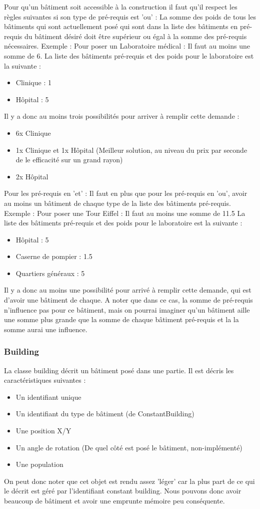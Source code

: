 \documentclass[a4paper,10pt,openany,oneside]{report}
\begin{document}
Pour qu'un bâtiment soit accessible à la construction il faut qu'il respect les règles suivantes si son type de pré-requis est 'ou' :
La somme des poids de tous les bâtiments qui sont actuellement posé qui sont dans la liste des bâtiments en pré-requis du bâtiment désiré doit être supérieur ou égal à la somme des pré-requis nécessaires.
Exemple :
Pour poser un Laboratoire médical : Il faut au moins une somme de 6.
La liste des bâtiments pré-requis et des poids pour le laboratoire est la suivante :
\begin{itemize}
	\item Clinique : 1
	\item Hôpital : 5
\end{itemize}
Il y a donc au moins trois possibilités pour arriver à remplir cette demande :
\begin{itemize}
	\item 6x Clinique
	\item 1x Clinique et 1x Hôpital (Meilleur solution, au niveau du prix par seconde de le efficacité sur un grand rayon)
	\item 2x Hôpital
\end{itemize}

Pour les pré-requis en 'et' :
Il faut en plus que pour les pré-requis en 'ou', avoir au moins un bâtiment de chaque type de la liste des bâtiments pré-requis.
Exemple :
Pour poser une Tour Eiffel : Il faut au moins une somme de 11.5
La liste des bâtiments pré-requis et des poids pour le laboratoire est la suivante :
\begin{itemize}
	\item Hôpital : 5
	\item Caserne de pompier : 1.5
	\item Quartiers généraux : 5
\end{itemize}
Il y a donc au moins une possibilité pour arrivé à remplir cette demande, qui est d'avoir une bâtiment de chaque. A noter que dans ce cas, la somme de pré-requis n'influence pas pour ce bâtiment, mais on pourrai imaginer qu'un bâtiment aille une somme plus grande que la somme de chaque bâtiment pré-requis et la la somme aurai une influence.

\subsubsection{Building}
La classe building décrit un bâtiment posé dans une partie. Il est décris les caractéristiques suivantes :
\begin{itemize}
	\item Un identifiant unique
	\item Un identifiant du type de bâtiment (de ConstantBuilding)
	\item Une position X/Y
	\item Un angle de rotation (De quel côté est posé le bâtiment, non-implémenté)
	\item Une population
\end{itemize}
On peut donc noter que cet objet est rendu assez 'léger' car la plus part de ce qui le décrit est géré par l'identifiant constant building. Nous pouvons donc avoir beaucoup de bâtiment et avoir une emprunte mémoire peu conséquente.
\end{document}
